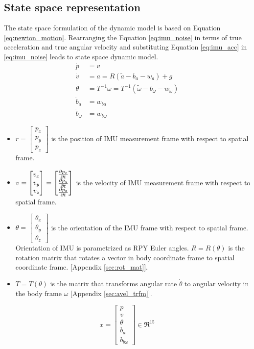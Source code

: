 \subsection{State space representation}
The state space formulation of the dynamic model is based on Equation \ref{eq:newton_motion}. Rearranging the Equation \ref{eq:imu_noise} in terms of true acceleration and true angular velocity and substituting Equation \ref{eq:imu_acc} in \ref{eq:imu_noise} leads to state space dynamic model. 
\begin{equation}
    \label{eq:dyn_imu}
    \begin{split}
    \dot{p} &= v \\
    \dot{v} &= a = R(\tilde{a} - b_a - w_a)+g \\
    \dot{\theta} &= T^{-1}\omega = T^{-1}(\tilde{\omega} - b_\omega - w_\omega) \\
    \dot{b}_a &= w_{ba}\\
    \dot{b}_\omega &= w_{b\omega}
    \end{split}
\end{equation}
\begin{itemize}
    \item $ r = \begin{bmatrix} p_x \\ p_y \\ p_z \end{bmatrix}$ is the position of IMU measurement frame with respect to spatial frame.
    \item $ v = \begin{bmatrix} v_x \\ v_y \\ v_z \end{bmatrix} = \begin{bmatrix} \frac{\partial {p_x}}{\partial {t}} \\ \frac{\partial {p_y}}{\partial {t}} \\ \frac{\partial {p_z}}{\partial {t}} \end{bmatrix}$ is the velocity of IMU measurement frame with respect to spatial frame.
    \item $ \theta = \begin{bmatrix} \theta_x \\ \theta_y \\ \theta_z \end{bmatrix}$ is the orientation of the IMU frame with respect to spatial frame. Orientation of IMU is parametrized as RPY Euler angles. $R=R(\theta)$ is the rotation matrix that rotates a vector in body coordinate frame to spatial coordinate frame. [Appendix \ref{sec:rot_mat}].
    \item $T=T(\theta)$ is the matrix that transforms angular rate $\dot{\theta}$ to angular velocity in the body frame $\omega$ [Appendix \ref{sec:avel_trfm}].
\end{itemize}
\begin{equation}
x = \begin{bmatrix} p \\ v \\ \theta \\ b_a \\ b_{b\omega} \end{bmatrix} \in \Re^{15}
\end{equation}

